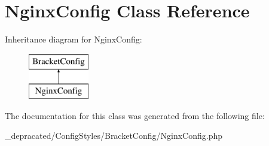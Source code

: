\hypertarget{class_config_styles_1_1_bracket_config_1_1_nginx_config}{
\section{\-Nginx\-Config \-Class \-Reference}
\label{class_config_styles_1_1_bracket_config_1_1_nginx_config}
}
\-Inheritance diagram for \-Nginx\-Config\-:\begin{figure}[H]
\begin{center}
\leavevmode
\includegraphics[height=2.000000cm]{class_config_styles_1_1_bracket_config_1_1_nginx_config}
\end{center}
\end{figure}


\-The documentation for this class was generated from the following file\-:\begin{DoxyCompactItemize}
\item 
\-\_\-depracated/\-Config\-Styles/\-Bracket\-Config/\-Nginx\-Config.\-php\end{DoxyCompactItemize}
